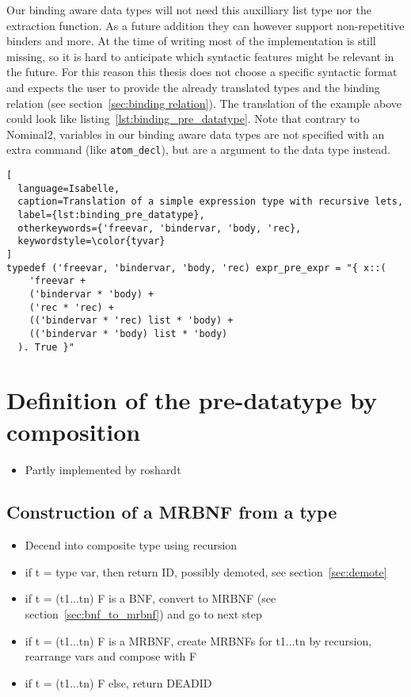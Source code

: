 Our binding aware data types will not need this auxilliary list type nor the extraction function. As a future addition they can however support non-repetitive binders and more. At the time of writing most of the implementation is still missing, so it is hard to anticipate which syntactic features might be relevant in the future. For this reason this thesis does not choose a specific syntactic format and expects the user to provide the already translated types and the binding relation (see section~\ref{sec:binding relation}). The translation of the example above could look like listing~\ref{lst:binding_pre_datatype}. Note that contrary to Nominal2, variables in our binding aware data types are not specified with an extra command (like \texttt{atom\_decl}), but are a argument to the data type instead.

\begin{lstlisting}[
  language=Isabelle,
  caption=Translation of a simple expression type with recursive lets,
  label={lst:binding_pre_datatype},
  otherkeywords={'freevar, 'bindervar, 'body, 'rec},
  keywordstyle=\color{tyvar}
]
typedef ('freevar, 'bindervar, 'body, 'rec) expr_pre_expr = "{ x::(
    'freevar +
    ('bindervar * 'body) +
    ('rec * 'rec) +
    (('bindervar * 'rec) list * 'body) +
    (('bindervar * 'body) list * 'body)
  ). True }"
\end{lstlisting}

\section{Definition of the pre-datatype by composition}

\begin{itemize}
\item{Partly implemented by roshardt~\cite{mrbnf_composition}}
\end{itemize}

\subsection{Construction of a MRBNF from a type}

\begin{itemize}
\item{Decend into composite type using recursion}
\item{if t = type var, then return ID, possibly demoted, see section~\ref{sec:demote}}
\item{if t = (t1...tn) F is a BNF, convert to MRBNF (see section~\ref{sec:bnf_to_mrbnf}) and go to next step}
\item{if t = (t1...tn) F is a MRBNF, create MRBNFs for t1...tn by recursion, rearrange vars and compose with F}
\item{if t = (t1...tn) F else, return DEADID}
\end{itemize}

